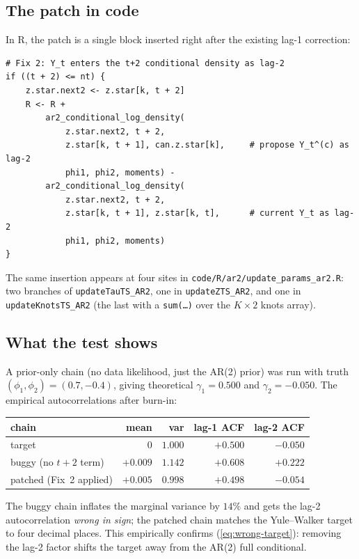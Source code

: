 \documentclass[11pt]{article}
\newcommand{\eref}[1]{(\ref{#1})}
\theoremstyle{plain}
\theoremstyle{definition}
\theoremstyle{remark}
\begin{document}
\subsection{The patch in code}\label{sec:patch-code}

In R, the patch is a single block inserted right after the existing
lag-1 correction:
\begin{lstlisting}
# Fix 2: Y_t enters the t+2 conditional density as lag-2
if ((t + 2) <= nt) {
    z.star.next2 <- z.star[k, t + 2]
    R <- R +
        ar2_conditional_log_density(
            z.star.next2, t + 2,
            z.star[k, t + 1], can.z.star[k],     # propose Y_t^(c) as lag-2
            phi1, phi2, moments) -
        ar2_conditional_log_density(
            z.star.next2, t + 2,
            z.star[k, t + 1], z.star[k, t],      # current Y_t as lag-2
            phi1, phi2, moments)
}
\end{lstlisting}
The same insertion appears at four sites in
\texttt{code/R/ar2/update\_params\_ar2.R}: two branches of
\texttt{updateTauTS\_AR2}, one in \texttt{updateZTS\_AR2}, and one in
\texttt{updateKnotsTS\_AR2} (the last with a \texttt{sum(\ldots)} over
the $K \times 2$ knots array).

\subsection{What the test shows}\label{sec:test}

A prior-only chain (no data likelihood, just the AR(2) prior) was run
with truth $(\phi_1, \phi_2) = (0.7, -0.4)$, giving theoretical
$\gamma_1 = 0.500$ and $\gamma_2 = -0.050$. The empirical
autocorrelations after burn-in:
\begin{center}
\begin{tabular}{lrrrr}
\toprule
chain                   & mean      & var       & lag-1 ACF & lag-2 ACF \\
\midrule
target                  & $0$       & $1.000$   & $+0.500$  & $-0.050$  \\
buggy   (no $t+2$ term) & $+0.009$  & $1.142$   & $+0.608$  & $+0.222$  \\
patched (Fix~2 applied) & $+0.005$  & $0.998$   & $+0.498$  & $-0.054$  \\
\bottomrule
\end{tabular}
\end{center}
The buggy chain inflates the marginal variance by $14\%$ and gets the
lag-2 autocorrelation \emph{wrong in sign}; the patched chain matches
the Yule--Walker target to four decimal places. This empirically confirms
\eref{eq:wrong-target}: removing the lag-2 factor shifts the target away
from the AR(2) full conditional.
\end{document}
